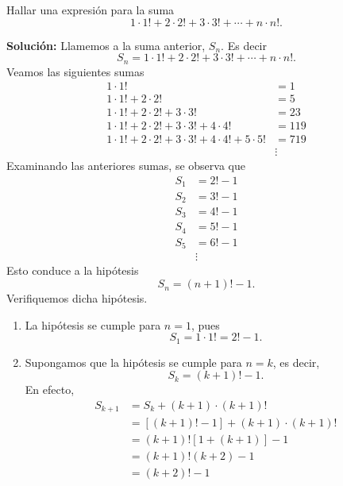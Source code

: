 \newpage

\begin{myexample}
    Hallar una expresión para la suma
    $$1 \cdot 1! + 2 \cdot 2! + 3 \cdot 3! + \cdots + n \cdot n!.$$
    
    \tcblower
    \textbf{\color{jblueleft}Solución:} Llamemos a la suma anterior, $S_n$. Es decir
    $$S_n=1 \cdot 1! + 2 \cdot 2! + 3 \cdot 3! + \cdots + n \cdot n!.$$
    Veamos las siguientes sumas
    \begin{align*}
        1 \cdot 1! &=1 \\
        1 \cdot 1!+2 \cdot 2! &=5 \\
        1 \cdot 1!+2 \cdot 2! + 3 \cdot 3! &=23 \\
        1 \cdot 1!+2 \cdot 2! + 3 \cdot 3! +4 \cdot 4! &=119 \\
        1 \cdot 1!+2 \cdot 2! + 3 \cdot 3! +4 \cdot 4! +5 \cdot 5! &=719 \\
        & \vdots
    \end{align*}
    Examinando las anteriores sumas, se observa que
    \begin{align*}
        S_1 &=2!-1 \\
        S_2 &=3!-1 \\
        S_3 &=4!-1 \\
        S_4 &=5!-1 \\
        S_5 &=6!-1 \\
        & \vdots
    \end{align*}
    Esto conduce a la hipótesis
    $$S_n=(n+1)!-1.$$
    Verifiquemos dicha hipótesis.
    \begin{enumerate}[label=\roman*)]
        \item La hipótesis se cumple para $n=1$, pues
        $$S_1=1 \cdot 1!=2!-1.$$
        \item Supongamos que la hipótesis se cumple para $n=k$, es decir,
        $$S_k=(k+1)!-1.$$
        En efecto,
        \begin{align*}
            S_{k+1} &= S_k + (k+1) \cdot (k+1)! \\
            &=[(k+1)!-1]+(k+1) \cdot (k+1)! \\
            &=(k+1)![1+(k+1)]-1 \\
            &=(k+1)!(k+2)-1 \\
            &=(k+2)!-1
        \end{align*}
    \end{enumerate}
\end{myexample}